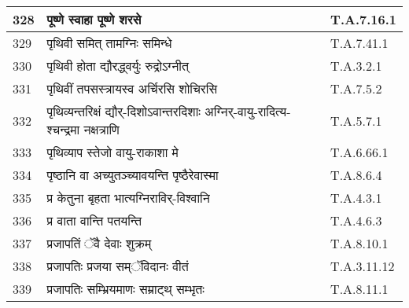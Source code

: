 \documentclass[17pt]{extarticle}
\begin{document}
\begin{longtable}{||p{0.4in}||p{4.9in}||p{0.9in}||}
    \hline
        
    328 & पूष्णे स्वाहा पूष्णे शरसे & T.A.7.16.1       \\
    
    \hline
        
    329 & पृथिवी समित् तामग्निः समिन्धे & T.A.7.41.1       \\
    
    \hline
        
    330 & पृथिवी होता द्यौरद्ध्वर्युः रुद्रोऽग्नीत् & T.A.3.2.1       \\
    
    \hline
        
    331 & पृथिवीं तपसस्त्रायस्व अर्चिरसि शोचिरसि & T.A.7.5.2       \\
    
    \hline
        
    332 & पृथिव्यन्तरिक्षं द्यौर्{-}दिशोऽवान्तरदिशाः अग्निर्{-}वायु{-}रादित्य{-}श्चन्द्रमा नक्षत्राणि & T.A.5.7.1       \\
    
    \hline
        
    333 & पृथिव्याप स्तेजो वायु{-}राकाशा मे & T.A.6.66.1       \\
    
    \hline
        
    334 & पृष्ठानि वा अच्युतञ्च्यावयन्ति पृष्ठैरेवास्मा & T.A.8.6.4       \\
    
    \hline
        
    335 & प्र केतुना बृहता भात्यग्निराविर्{-}विश्वानि & T.A.4.3.1       \\
    
    \hline
        
    336 & प्र वाता वान्ति पतयन्ति & T.A.4.6.3       \\
    
    \hline
        
    337 & प्रजापतिं ॅवै देवाः शुक्रम् & T.A.8.10.1       \\
    
    \hline
        
    338 & प्रजापतिः प्रजया सम्ॅविदानः वीतं & T.A.3.11.12       \\
    
    \hline
        
    339 & प्रजापतिः सम्भ्रियमाणः सम्राट्थ् सम्भृतः & T.A.8.11.1       \\
    
    \hline
        

\end{longtable}
\end{document}
